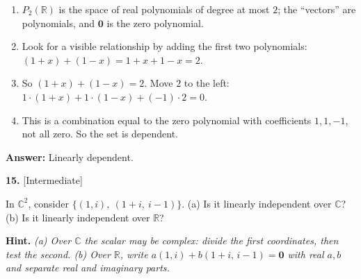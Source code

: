 \documentclass[11pt]{article}
\begin{document}
\begin{tcolorbox}[breakable,colback=ans,colframe=ansb,boxrule=0.5pt,left=4pt,right=4pt,top=2pt,bottom=2pt]\begin{enumerate}[leftmargin=2.2em,itemsep=1pt,topsep=1pt,label=\textbf{Step \arabic*.}]\item $P_{2}(\mathbb{R})$ is the space of real polynomials of degree at most $2$; the ``vectors'' are polynomials, and $\mathbf 0$ is the zero polynomial.
\item Look for a visible relationship by adding the first two polynomials: $(1+x)+(1-x)=1+x+1-x=2$.
\item So $(1+x)+(1-x)=2$. Move $2$ to the left: $1\cdot(1+x)+1\cdot(1-x)+(-1)\cdot2=0$.
\item This is a combination equal to the zero polynomial with coefficients $1,1,-1$, not all zero. So the set is dependent.
\end{enumerate}\textbf{Answer:} Linearly dependent.\end{tcolorbox}
\par\vspace{2pt}
\begin{minipage}{\linewidth}\textbf{15.} \hfill{\scriptsize\color{ink}[Intermediate]}\par\nopagebreak In $\mathbb{C}^{2}$, consider $\{(1,i),\ (1+i,\ i-1)\}$. (a) Is it linearly independent over $\mathbb{C}$? (b) Is it linearly independent over $\mathbb{R}$?
\par\smallskip\begingroup\small\color{ink}\textbf{Hint.} \textit{(a) Over $\mathbb{C}$ the scalar may be complex: divide the first coordinates, then test the second. (b) Over $\mathbb{R}$, write $a(1,i)+b(1+i,\,i-1)=\mathbf 0$ with real $a,b$ and separate real and imaginary parts.}\endgroup
\end{minipage}\par\nopagebreak
\end{document}
